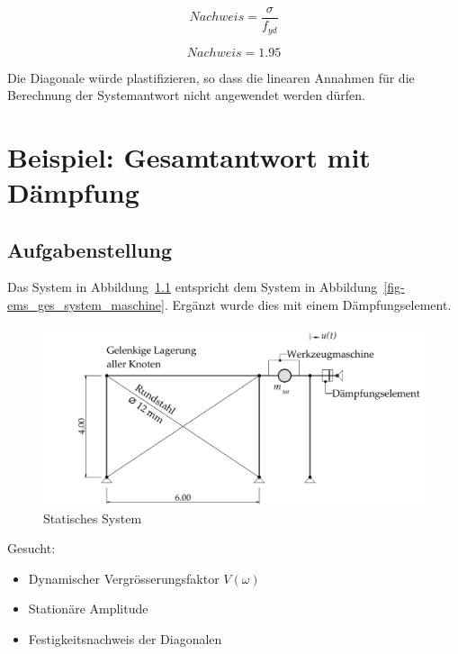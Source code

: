 \documentclass[
  letterpaper,
  DIV=11]{scrreprt}
\providecommand{\tightlist}{%
  \setlength{\itemsep}{0pt}\setlength{\parskip}{0pt}}\usepackage{longtable,booktabs,array}
\begin{document}
\begin{equation}Nachweis = \frac{\sigma}{f_{yd}}\end{equation}

\begin{equation}Nachweis = 1.95\end{equation}

Die Diagonale würde plastifizieren, so dass die linearen Annahmen für
die Berechnung der Systemantwort nicht angewendet werden dürfen.

\hypertarget{beispiel-gesamtantwort-mit-duxe4mpfung}{%
\chapter{Beispiel: Gesamtantwort mit
Dämpfung}\label{beispiel-gesamtantwort-mit-duxe4mpfung}}

\hypertarget{aufgabenstellung-7}{%
\section{Aufgabenstellung}\label{aufgabenstellung-7}}

Das System in Abbildung~\ref{fig-ems_dampf_system} entspricht dem System
in Abbildung~\ref{fig-ems_ges_system_maschine}. Ergänzt wurde dies mit
einem Dämpfungselement.

\begin{figure}[H]

{\centering \includegraphics{index_files/mediabag/bilder/aufgabe_ems_gedampft_system.pdf}

}

\caption{\label{fig-ems_dampf_system}Statisches System}

\end{figure}

Gesucht:

\begin{itemize}
\tightlist
\item
  Dynamischer Vergrösserungsfaktor \(V(\omega)\)
\item
  Stationäre Amplitude
\item
  Festigkeitsnachweis der Diagonalen
\end{itemize}
\end{document}
